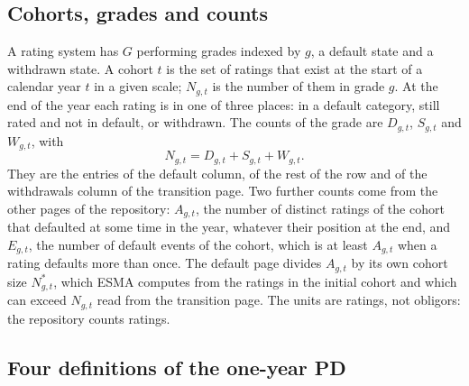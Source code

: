 \subsection{Cohorts, grades and counts}
\label{sec:problem-cohorts}

A rating system has $G$ performing grades indexed by $g$, a default state and a withdrawn state. A cohort $t$ is the set of ratings that exist at the start of a calendar year $t$ in a given scale; $N_{g,t}$ is the number of them in grade $g$. At the end of the year each rating is in one of three places: in a default category, still rated and not in default, or withdrawn. The counts of the grade are $D_{g,t}$, $S_{g,t}$ and $W_{g,t}$, with %
\begin{equation}
N_{g,t} = D_{g,t} + S_{g,t} + W_{g,t}.
\label{eq:cohort}
\end{equation}
They are the entries of the default column, of the rest of the row and of the withdrawals column of the transition page. Two further counts come from the other pages of the repository: $A_{g,t}$, the number of distinct ratings of the cohort that defaulted at some time in the year, whatever their position at the end, and $E_{g,t}$, the number of default events of the cohort, which is at least $A_{g,t}$ when a rating defaults more than once. The default page divides $A_{g,t}$ by its own cohort size $N^{\ast}_{g,t}$, which ESMA computes from the ratings in the initial cohort and which can exceed $N_{g,t}$ read from the transition page. The units are ratings, not obligors: the repository counts ratings.

\subsection{Four definitions of the one-year PD}
\label{sec:problem-definitions}

